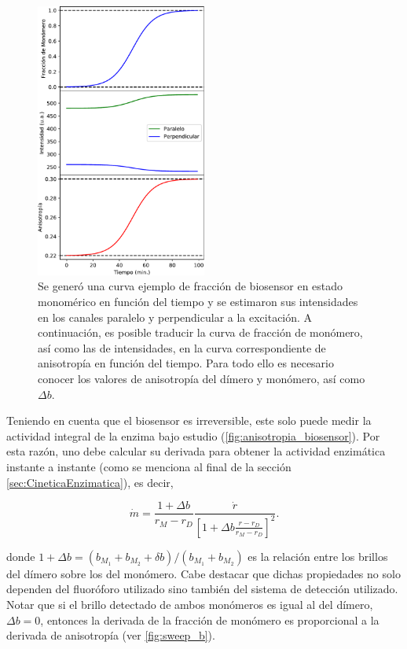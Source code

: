 \begin{figure}[htb]
    \centering
    \includegraphics[width=0.5\textwidth]{img/cap_2/mono_to_ani.pdf}
    \caption{\footnotesize{Se generó una curva ejemplo de fracción de biosensor en estado monomérico en función del tiempo y se estimaron sus intensidades en los canales paralelo y perpendicular a la excitación. A continuación, es posible traducir la curva de fracción de monómero, así como las de intensidades, en la curva correspondiente de anisotropía en función del tiempo. Para todo ello es necesario conocer los valores de anisotropía del dímero y monómero, así como $\Delta b$.}}
    \label{fig:mono_to_ani}
\end{figure}

Teniendo en cuenta que el biosensor es irreversible, este solo puede medir la actividad integral de la enzima bajo estudio (\cref{fig:anisotropia_biosensor}). Por esta razón, uno debe calcular su derivada para obtener la actividad enzimática instante a instante (como se menciona al final de la sección \ref{sec:CineticaEnzimatica}), es decir,

\begin{equation}
	\dot{m} = \frac{1 + \Delta b}{r_M - r_D} \frac{\dot{r}}{\left[1 + \Delta b \frac{r - r_D}{r_M - r_D}\right]^2}.
	\label{eq:m_der}
\end{equation}

\noindent donde $1 + \Delta b = (b_{M_1} + b_{M_2} + \delta b) / (b_{M_1} + b_{M_2})$ es la relación entre los brillos del dímero sobre los del monómero. Cabe destacar que dichas propiedades no solo dependen del fluoróforo utilizado sino también del sistema de detección utilizado. Notar que si el brillo detectado de ambos monómeros es igual al del dímero, $\Delta b = 0$, entonces la derivada de la fracción de monómero es proporcional a la derivada de anisotropía (ver \cref{fig:sweep_b}). 

